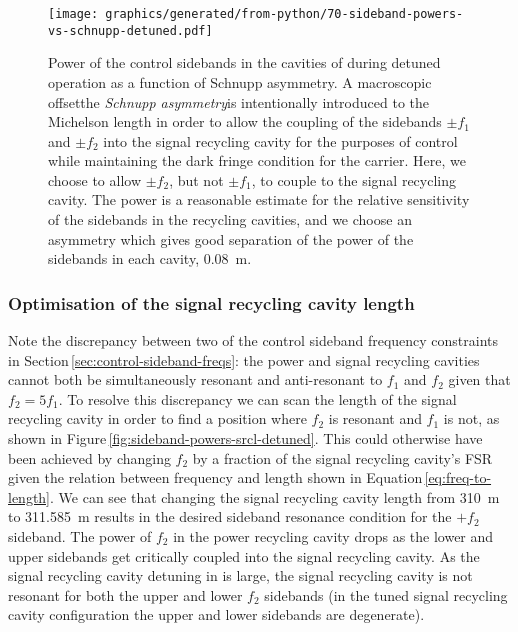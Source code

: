 \begin{figure}
  \centering
  \texttt{[image: graphics/generated/from-python/70-sideband-powers-vs-schnupp-detuned.pdf]}
  \caption[Power of the control sidebands in the cavities of \ETLF{} in detuned configuration as a function of Schnupp asymmetry]{\label{fig:sideband-powers-vs-schnupp-detuned}Power of the control sidebands in the cavities of \ETLF{} during detuned operation as a function of Schnupp asymmetry. A macroscopic offset\textemdash the \emph{Schnupp asymmetry}\textemdash is intentionally introduced to the Michelson length in order to allow the coupling of the sidebands $\pm f_1$ and $\pm f_2$ into the signal recycling cavity for the purposes of control while maintaining the dark fringe condition for the carrier. Here, we choose to allow $\pm f_2$, but not $\pm f_1$, to couple to the signal recycling cavity. The power is a reasonable estimate for the relative sensitivity of the sidebands in the recycling cavities, and we choose an asymmetry which gives good separation of the power of the sidebands in each cavity, \SI{0.08}{\meter}.}
\end{figure}

\subsubsection{Optimisation of the signal recycling cavity length}
Note the discrepancy between two of the control sideband frequency constraints in Section\,\ref{sec:control-sideband-freqs}: the power and signal recycling cavities cannot both be simultaneously resonant and anti-resonant to $f_1$ and $f_2$ given that $f_2 = 5 f_1$. To resolve this discrepancy we can scan the length of the signal recycling cavity in order to find a position where $f_2$ is resonant and $f_1$ is not, as shown in Figure\,\ref{fig:sideband-powers-srcl-detuned}. This could otherwise have been achieved by changing $f_2$ by a fraction of the signal recycling cavity's \gls{FSR} given the relation between frequency and length shown in Equation\,\ref{eq:freq-to-length}. We can see that changing the signal recycling cavity length from \SI{310}{\meter} to \SI{311.585}{\meter} results in the desired sideband resonance condition for the $+f_2$ sideband. The power of $f_2$ in the power recycling cavity drops as the lower and upper sidebands get critically coupled into the signal recycling cavity. As the signal recycling cavity detuning in \ETLF{} is large, the signal recycling cavity is not resonant for both the upper and lower $f_2$ sidebands (in the tuned signal recycling cavity configuration the upper and lower sidebands are degenerate).

